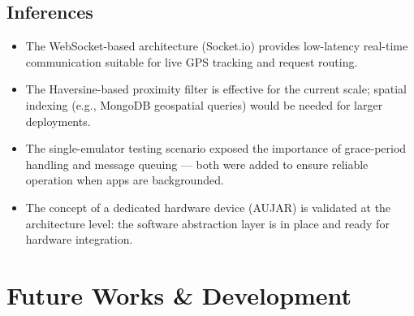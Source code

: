 \documentclass[12pt, a4paper]{article}
\begin{document}
\subsection{Inferences}

\begin{itemize}[noitemsep]
    \item The WebSocket-based architecture (Socket.io) provides low-latency real-time communication suitable for live GPS tracking and request routing.
    \item The Haversine-based proximity filter is effective for the current scale; spatial indexing (e.g., MongoDB geospatial queries) would be needed for larger deployments.
    \item The single-emulator testing scenario exposed the importance of grace-period handling and message queuing --- both were added to ensure reliable operation when apps are backgrounded.
    \item The concept of a dedicated hardware device (AUJAR) is validated at the architecture level: the software abstraction layer is in place and ready for hardware integration.
\end{itemize}

\section{Future Works \& Development}
\end{document}
